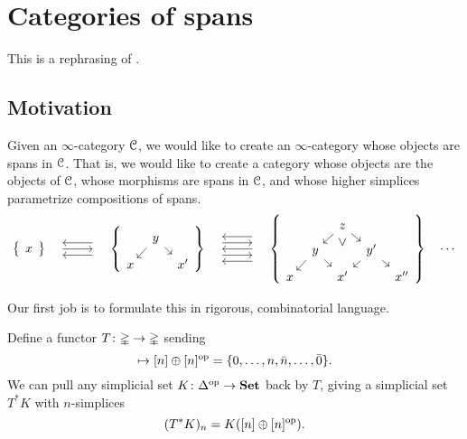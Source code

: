 \documentclass[main.tex]{subfiles}
\begin{document}
\chapter{Categories of spans}
\label{ch:categories_of_spans}

This is a rephrasing of \cite{1409.0837}.

\section{Motivation}

Given an $\infty$-category $\mathcal{C}$, we would like to create an $\infty$-category whose objects are spans in $\mathcal{C}$. That is, we would like to create a category whose objects are the objects of $\mathcal{C}$, whose morphisms are spans in $\mathcal{C}$, and whose higher simplices parametrize compositions of spans.
\begin{equation*}
  \left\{
    \begin{tikzcd}
      x
    \end{tikzcd}
  \right\}
  \begin{tikzcd}
    \
    \arrow[r]
    & \
    \arrow[l, shift left=2]
    \arrow[l, shift right=2]
  \end{tikzcd}
  \left\{
    \begin{tikzcd}[row sep=tiny, column sep=tiny]
      & y
      \arrow[dl]
      \arrow[dr]
      \\
      x
      && x'
    \end{tikzcd}
  \right\}
  \begin{tikzcd}
    \
    \arrow[r, shift right=2]
    \arrow[r, shift left=2]
    & \
    \arrow[l, shift left=0]
    \arrow[l, shift left=4]
    \arrow[l, shift right=4]
  \end{tikzcd}
  \left\{
    \begin{tikzcd}[row sep=tiny, column sep=tiny]
      && z
      \arrow[dd, phantom, near start, "\vee" label]
      \arrow[dl]
      \arrow[dr]
      \\
      & y
      \arrow[dr]
      \arrow[dl]
      && y'
      \arrow[dl]
      \arrow[dr]
      \\
      x
      && x'
      && x''
    \end{tikzcd}
  \right\}
  \quad \cdots
\end{equation*}

Our first job is to formulate this in rigorous, combinatorial language.

\begin{definition}
  Define a functor $T\colon \mathbb{\Delta} \to \mathbb{\Delta}$ sending
  \begin{equation*}
    [n] \mapsto [n] \oplus [n]\op = \{0, \ldots, n, \bar{n}, \ldots, \bar{0}\}.
  \end{equation*}
  We can pull any simplicial set $K\colon \Delta^{\mathrm{op}} \to \mathbf{Set}$ back by $T$, giving a simplicial set $T^{*}K$ with $n$-simplices
  \begin{equation*}
    (T^{*}K)_{n} = K([n] \oplus [n]^{\mathrm{op}}).
  \end{equation*}
\end{definition}
\end{document}
